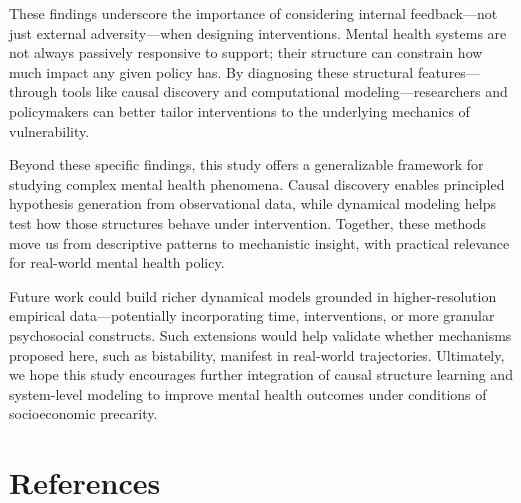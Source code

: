 \documentclass[
]{article}
\begin{document}
These findings underscore the importance of considering internal
feedback---not just external adversity---when designing interventions.
Mental health systems are not always passively responsive to support;
their structure can constrain how much impact any given policy has. By
diagnosing these structural features---through tools like causal
discovery and computational modeling---researchers and policymakers can
better tailor interventions to the underlying mechanics of
vulnerability.

Beyond these specific findings, this study offers a generalizable
framework for studying complex mental health phenomena. Causal discovery
enables principled hypothesis generation from observational data, while
dynamical modeling helps test how those structures behave under
intervention. Together, these methods move us from descriptive patterns
to mechanistic insight, with practical relevance for real-world mental
health policy.

Future work could build richer dynamical models grounded in
higher-resolution empirical data---potentially incorporating time,
interventions, or more granular psychosocial constructs. Such extensions
would help validate whether mechanisms proposed here, such as
bistability, manifest in real-world trajectories. Ultimately, we hope
this study encourages further integration of causal structure learning
and system-level modeling to improve mental health outcomes under
conditions of socioeconomic precarity.

\section{References}\label{references}
\end{document}
